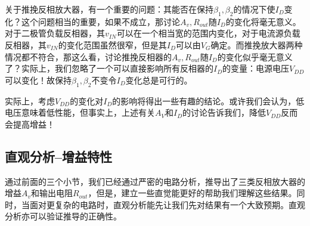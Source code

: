 关于推挽反相放大器，有一个重要的问题：其能否在保持$\beta_1,\beta_2$的情况下使$I_D$变化？这个问题相当的重要，如果不成立，那讨论$A_v,R_{out}$随$I_D$的变化将毫无意义。对于二极管负载反相器，其$v_{IN}$可以在一个相当宽的范围内变化，对于电流源负载反相器，其$v_{IN}$的变化范围虽然很窄，但是其$I_D$可以由$V_G$确定。而推挽放大器两种情况都不符合，那这么看，讨论推挽反相器的$A_v,R_{out}$随$I_D$的变化似乎毫无意义了？实际上，我们忽略了一个可以直接影响所有反相器的$I_D$的变量：电源电压$V_{DD}$可以变化！故保持$\beta_1,\beta_2$不变令$I_D$变化总是可行的。

实际上，考虑$V_{DD}$的变化对$I_D$的影响将得出一些有趣的结论。或许我们会认为，低电压意味着低性能，但事实上，上述有关$A_V$和$I_D$的讨论告诉我们，降低$V_{DD}$反而会提高增益！

\subsection{直观分析--增益特性}
通过前面的三个小节，我们已经通过严密的电路分析，推导出了三类反相放大器的增益$A_v$和输出电阻$R_{out}$，但是，建立一些直觉能更好的帮助我们理解这些结果。同时，当面对更复杂的电路时，直观分析能先让我们先对结果有一个大致预期。直观分析亦可以验证推导的正确性。

